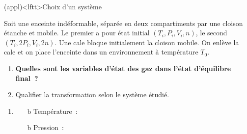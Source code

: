 \documentclass[../../main/main.tex]{subfiles}
\begin{document}
\begin{tcb*}[breakable](appl)<lftt>{Choix d'un système}
	\begin{isd}
		Soit une enceinte indéformable, séparée en deux compartiments par une
		cloison étanche et mobile. Le premier a pour état initial $(T_i,P_i,V_i,n)$,
		le second $(T_i,2P_i,V_i,2n)$. Une cale bloque initialement la cloison
		mobile. On enlève la cale et on place l'enceinte dans un environnement à
		température $T_0$.
		\tcblower
		\begin{center}
			\vspace{-15pt}
		\end{center}
	\end{isd}
	\begin{enumerate}
		\item \textbf{Quelles sont les variables d'état des gaz dans l'état
			      d'équilibre final~?}
		\item Qualifier la transformation selon le système étudié.
	\end{enumerate}
	\tcblower
	\begin{enumerate}
		\item \begin{itemize}
			      \item[b]{Température}~: 
			      \item[b]{Pression}~: 

\end{itemize}
\end{enumerate}
\end{tcb*}
\end{document}
